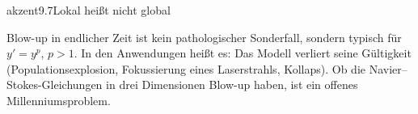 \begin{loesungkarte}{akzent}{9.7}{Lokal heißt nicht global}
\begin{fehler}
\end{fehler}
\begin{mitnehmen}\kastentext
Blow-up in endlicher Zeit ist kein pathologischer Sonderfall, sondern typisch für $y' = y^{p}$, $p > 1$. In den Anwendungen heißt es: Das Modell verliert seine Gültigkeit (Populationsexplosion, Fokussierung eines Laserstrahls, Kollaps). Ob die Navier--Stokes-Gleichungen in drei Dimensionen Blow-up haben, ist ein offenes Millenniumsproblem.
\end{mitnehmen}
\end{loesungkarte}

